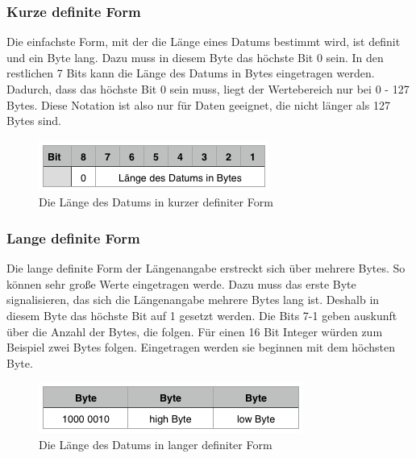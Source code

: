 \documentclass[11pt,a4paper]{article}
\begin{document}
\subsubsection{Kurze definite Form}
Die einfachste Form, mit der die Länge eines Datums bestimmt wird, ist definit und ein Byte lang. Dazu muss in diesem Byte das höchste Bit 0 sein. In den restlichen 7 Bits kann die Länge des Datums in Bytes eingetragen werden. Dadurch, dass das höchste Bit 0 sein muss, liegt der Wertebereich nur bei 0 - 127 Bytes. Diese Notation ist also nur für Daten geeignet, die nicht länger als 127 Bytes sind.
\\
\begin{figure}[h]
	\centering
	\includegraphics[scale=1]{Bilder/laengeDefinitKurz}
	\caption{Die Länge des Datums in kurzer definiter Form}
\end{figure}

\subsubsection{Lange definite Form}
Die lange definite Form der Längenangabe erstreckt sich über mehrere Bytes. So können sehr große Werte eingetragen werde. Dazu muss das erste Byte signalisieren, das sich die Längenangabe mehrere Bytes lang ist. Deshalb in diesem Byte das höchste Bit auf 1 gesetzt werden. Die Bits 7-1 geben auskunft über die Anzahl der Bytes, die folgen. Für einen 16 Bit Integer würden zum Beispiel zwei Bytes folgen. Eingetragen werden sie beginnen mit dem höchsten Byte.
\\
\begin{figure}[h]
	\centering
	\includegraphics[scale=1]{Bilder/laengeDefinitLang}
	\caption{Die Länge des Datums in langer definiter Form}
\end{figure}
\end{document}
